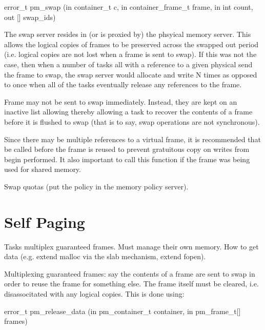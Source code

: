 \begin{code}
error\_t pm\_swap (in container\_t c, in container\_frame\_t frame, in int
count, out [] swap\_ids)
\end{code}

The swap server resides in (or is proxied by) the phsyical memory
server.  This allows the logical copies of frames to be preserved
across the swapped out period (i.e. logical copies are not lost when a
frame is sent to swap).  If this was not the case, then when a number
of tasks all with a reference to a given physical send the frame to
swap, the swap server would allocate and write N times as opposed to
once when all of the tasks eventually release any references to the
frame.

Frame may not be sent to swap immediately.  Instead, they are kept on
an inactive list allowing thereby allowing a task to recover the
contents of a frame before it is flushed to swap (that is to say, swap
operations are not synchronous).

Since there may be multiple references to a virtual frame, it is
recommended that  be called
before the frame is reused to prevent gratuitous copy on writes from
begin performed.  It also important to call this function if the frame
was being used for shared memory.

Swap quotas (put the policy in the memory policy server).

\section{Self Paging}

Tasks multiplex guaranteed frames.  Must manage their own memory.  How
to get data (e.g. extend malloc via the slab mechanism, extend fopen).

Multiplexing guaranteed frames: say the contents of a frame are sent
to swap in order to reuse the frame for something else.  The frame
itself must be cleared, i.e. disassocitated with any logical copies.
This is done using:

\begin{code}
error\_t pm\_release\_data (in pm\_container\_t container, in pm\_frame\_t[] frames)
\end{code}


